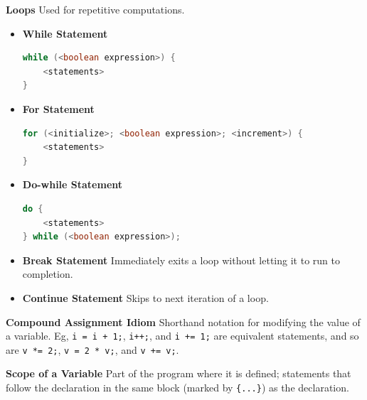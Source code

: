 \documentclass[8pt,a4paper,compress]{beamer}
\begin{document}
\begin{frame}[fragile]
\pause
\textbf{Loops} Used for repetitive computations.

\pause
\smallskip

\begin{itemize}
\item \textbf{While Statement}
\begin{lstlisting}[language=Java]
while (<boolean expression>) {
    <statements>
}
\end{lstlisting}

\pause

\item \textbf{For Statement} 
\begin{lstlisting}[language=Java]
for (<initialize>; <boolean expression>; <increment>) {
    <statements>
}
\end{lstlisting}

\pause
\item \textbf{Do-while Statement} 
\begin{lstlisting}[language=Java]
do {
    <statements>
} while (<boolean expression>);
\end{lstlisting}

\pause

\item \textbf{Break Statement} Immediately exits a loop without letting it to run to completion. 

\pause

\item \textbf{Continue Statement} Skips to next iteration of a loop.
\end{itemize}

\pause
\smallskip

\textbf{Compound Assignment Idiom} Shorthand notation for modifying the value of a variable. Eg, \lstinline$i = i + 1;$, \lstinline$i++;$, and \lstinline$i += 1;$ are equivalent statements, and so are \lstinline$v *= 2;$, \lstinline$v = 2 * v;$, and \lstinline$v += v;$.

\pause
\smallskip

\textbf{Scope of a Variable} Part of the program where it is defined;  statements that follow the declaration in the same block (marked by \lstinline${...}$) as the declaration.
\end{frame}
\end{document}
